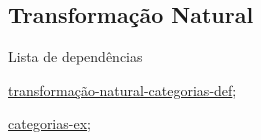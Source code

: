 \subsection{Transformação Natural}
\label{transformação-natural-categorias-ex}
\begin{titlemize}{Lista de dependências}
	\item \hyperref[transformação-natural-categorias-def]{transformação-natural-categorias-def};\\ %
	\item \hyperref[categorias-ex]{categorias-ex};\\
\end{titlemize}

